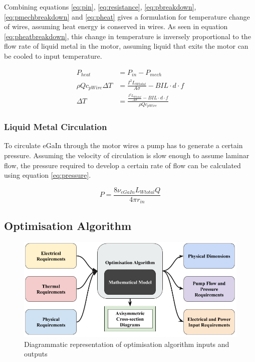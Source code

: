 \documentclass[a4paper,12pt]{article}
\begin{document}
Combining equations \ref{eq:pin}, \ref{eq:resistance}, \ref{eq:pbreakdown}, \ref{eq:pmechbreakdown} and \ref{eq:pheat} gives a formulation for temperature change of wires, assuming heat energy is conserved in wires. As seen in equation \ref{eq:pheatbreakdown}, this change in temperature is inversely proportional to the flow rate of liquid metal in the motor, assuming liquid that exits the motor can be cooled to input temperature.

\begin{equation}\label{eq:pheatbreakdown}
    \begin{split}
        P_{heat} & = P_{in}-P_{mech}\\
        \rho Q c_{pWire} \Delta T & = \frac{I^2L_{Wtotal}}{A\sigma}-BIL\cdot d \cdot f \\
        \Delta T & = \frac{\frac{I^2L_{Wtotal}}{A\sigma}-BIL\cdot d \cdot f}{\rho Q c_{pWire}}
    \end{split}
\end{equation}

\subsubsection{Liquid Metal Circulation}
To circulate eGaIn through the motor wires a pump has to generate a certain pressure. Assuming the velocity of circulation is slow enough to assume laminar flow, the pressure required to develop a certain rate of flow can be calculated using equation \ref{eq:pressure}.

\begin{equation}\label{eq:pressure}
    P=\frac{8\nu_{eGaIn}L_{Wtotal}Q}{4\pi r_{in}}
\end{equation}

\subsection{Optimisation Algorithm}

\begin{figure}[h!]
    \centering
    \includegraphics[scale=0.4]{optiAlgro.png}
    \caption{Diagrammatic representation of optimisation algorithm inputs and outputs}
    \label{fg:optiAlgo}
\end{figure}
\end{document}

